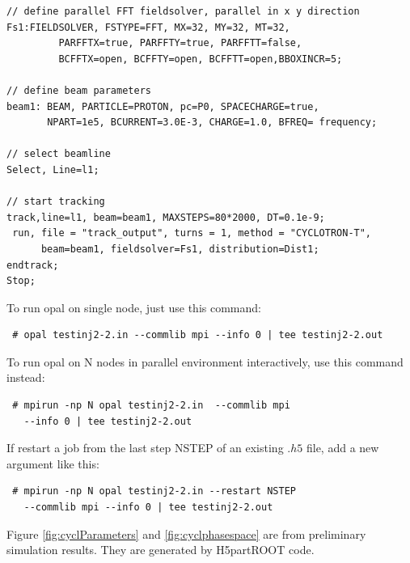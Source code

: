 {\begin{verbatim}
// define parallel FFT fieldsolver, parallel in x y direction
Fs1:FIELDSOLVER, FSTYPE=FFT, MX=32, MY=32, MT=32, 
		 PARFFTX=true, PARFFTY=true, PARFFTT=false,
		 BCFFTX=open, BCFFTY=open, BCFFTT=open,BBOXINCR=5;

// define beam parameters
beam1: BEAM, PARTICLE=PROTON, pc=P0, SPACECHARGE=true,
       NPART=1e5, BCURRENT=3.0E-3, CHARGE=1.0, BFREQ= frequency;

// select beamline
Select, Line=l1;

// start tracking
track,line=l1, beam=beam1, MAXSTEPS=80*2000, DT=0.1e-9;
 run, file = "track_output", turns = 1, method = "CYCLOTRON-T", 
      beam=beam1, fieldsolver=Fs1, distribution=Dist1;
endtrack;
Stop;
\end{verbatim}
}
To run opal on single node, just use this command:
{ \footnotesize 
\begin{verbatim}
 # opal testinj2-2.in --commlib mpi --info 0 | tee testinj2-2.out
\end{verbatim}
}
To run opal on N nodes in parallel environment interactively, use this command instead:
{ \footnotesize 
\begin{verbatim}
 # mpirun -np N opal testinj2-2.in  --commlib mpi 
   --info 0 | tee testinj2-2.out
\end{verbatim}
 }
If restart a job from the last step NSTEP of an existing $.h5$ file, add a new argument like this: 
{ \footnotesize 
\begin{verbatim}
 # mpirun -np N opal testinj2-2.in --restart NSTEP 
   --commlib mpi --info 0 | tee testinj2-2.out
\end{verbatim}
}
Figure \ref{fig:cyclParameters} and \ref{fig:cyclphasespace} are from preliminary simulation results.
They are generated by H5partROOT code.   
